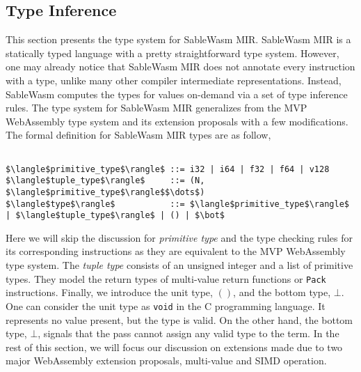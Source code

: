 \subsection{Type Inference}

This section presents the type system for SableWasm MIR. SableWasm MIR is a
statically typed language with a pretty straightforward type system. However,
one may already notice that SableWasm MIR does not annotate every instruction
with a type, unlike many other compiler intermediate representations. Instead,
SableWasm computes the types for values on-demand via a set of type inference
rules. The type system for SableWasm MIR generalizes from the MVP WebAssembly
type system and its extension proposals with a few modifications. The
formal definition for SableWasm MIR types are as follow,

\begin{lstlisting}[basicstyle=\linespread{1}\ttfamily, mathescape=true]

$\langle$primitive_type$\rangle$ ::= i32 | i64 | f32 | f64 | v128
$\langle$tuple_type$\rangle$     ::= (N, $\langle$primitive_type$\rangle$$\dots$)
$\langle$type$\rangle$           ::= $\langle$primitive_type$\rangle$ | $\langle$tuple_type$\rangle$ | () | $\bot$

\end{lstlisting}

Here we will skip the discussion for \emph{primitive type} and the type checking
rules for its corresponding instructions as they are equivalent to the MVP
WebAssembly type system. The \emph{tuple type} consists of an unsigned integer
and a list of primitive types. They model the return types of multi-value return
functions or \texttt{Pack} instructions. Finally, we introduce the unit type,
$()$, and the bottom type, $\bot$. One can consider the unit type as
\texttt{void} in the C programming language. It represents no value present,
but the type is valid. On the other hand, the bottom type, $\bot$, signals that
the pass cannot assign any valid type to the term. In the rest of this section,
we will focus our discussion on extensions made due to two major WebAssembly
extension proposals, multi-value and SIMD operation.

